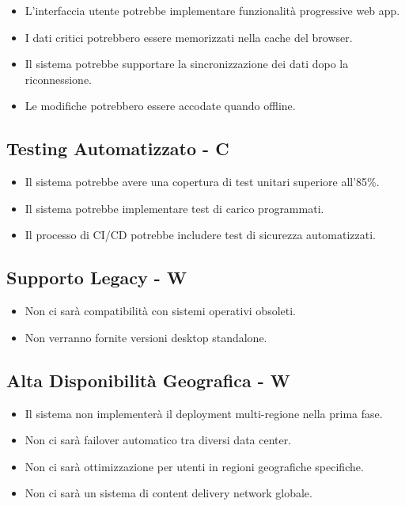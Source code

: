 \documentclass[12pt,a4paper,oneside]{report}
\begin{document}
\begin{itemize}
    \item L'interfaccia utente potrebbe implementare funzionalità progressive web app.
    \item I dati critici potrebbero essere memorizzati nella cache del browser.
    \item Il sistema potrebbe supportare la sincronizzazione dei dati dopo la riconnessione.
    \item Le modifiche potrebbero essere accodate quando offline.
\end{itemize}

\subsection{Testing Automatizzato - C}

\begin{itemize}
    \item Il sistema potrebbe avere una copertura di test unitari superiore all'85\%.
    \item Il sistema potrebbe implementare test di carico programmati.
    \item Il processo di CI/CD potrebbe includere test di sicurezza automatizzati.
\end{itemize}

\subsection{Supporto Legacy - W}

\begin{itemize}
    \item Non ci sarà compatibilità con sistemi operativi obsoleti.
    \item Non verranno fornite versioni desktop standalone.
\end{itemize}

\subsection{Alta Disponibilità Geografica - W}

\begin{itemize}
    \item Il sistema non implementerà il deployment multi-regione nella prima fase.
    \item Non ci sarà failover automatico tra diversi data center.
    \item Non ci sarà ottimizzazione per utenti in regioni geografiche specifiche.
    \item Non ci sarà un sistema di content delivery network globale.
\end{itemize}
\end{document}
